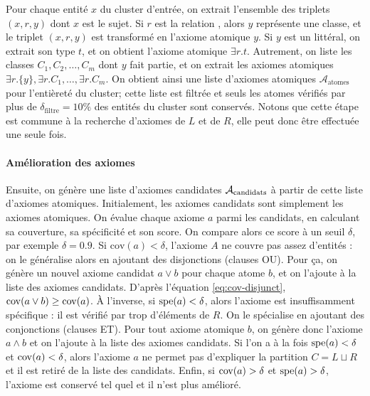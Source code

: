 Pour chaque entité $x$ du cluster d'entrée, on extrait l'ensemble des triplets $(x, r, y)$ dont $x$ est le sujet. Si $r$ est la relation , alors $y$ représente une classe, et le triplet $(x, r, y)$ est transformé en l'axiome atomique $y$. Si $y$ est un littéral, on extrait son type $t$, et on obtient l'axiome atomique $\exists r.t$. Autrement, on liste les classes $C_1, C_2, \ldots, C_m$ dont $y$ fait partie, et on extrait les axiomes atomiques $\exists r.\{y\}, \exists r.C_1, \ldots, \exists r.C_m$. On obtient ainsi une liste d'axiomes atomiques $\mathcal{A}_\text{atomes}$ pour l'entièreté du cluster; cette liste est filtrée et seuls les atomes vérifiés par plus de $\delta_\text{filtre} = 10\%$ des entités du cluster sont conservés. Notons que cette étape est commune à la recherche d'axiomes de $L$ et de $R$, elle peut donc être effectuée une seule fois.

\paragraph{Amélioration des axiomes}

Ensuite, on génère une liste d'axiomes candidates $\cal{A}_\text{candidats}$ à partir de cette liste d'axiomes atomiques. Initialement, les axiomes candidats sont simplement les axiomes atomiques. On évalue chaque axiome $a$ parmi les candidats, en calculant sa couverture, sa spécificité et son score. On compare alors ce score à un seuil $\delta$, par exemple $\delta = 0.9$. Si $\text{cov}(a) < \delta$, l'axiome $A$ ne couvre pas assez d'entités : on le généralise alors en ajoutant des disjonctions (clauses OU). %
Pour ça, on génère un nouvel axiome candidat $a \lor b$ pour chaque atome $b$, 
et on l'ajoute à la liste des axiomes candidats. D'après l'équation \ref{eq:cov-disjunct}, $\cov(a \lor b) \geq \cov(a)$.
À l'inverse, si $\spe(a) < \delta$, alors l'axiome est insuffisamment spécifique : il est vérifié par trop d'éléments de $R$. 
On le spécialise en ajoutant des conjonctions (clauses ET).
Pour tout axiome atomique $b$, on génère donc l'axiome $a \land b$ et on l'ajoute à la liste des axiomes candidats. 
Si l'on a à la fois $\spe(a) < \delta$ et $\cov(a) < \delta$, alors l'axiome $a$ ne permet pas d'expliquer la partition $C = L \sqcup R$ et il est retiré de la liste des candidats. Enfin, si $\cov(a) > \delta$ et $\spe(a) > \delta$, l'axiome est conservé tel quel et il n'est plus amélioré.

